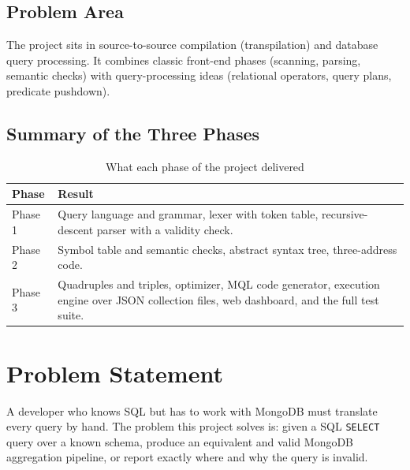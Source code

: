 \documentclass[12pt,a4paper]{report}
\newcommand{\codeus}{\textunderscore\allowbreak}
\DeclareRobustCommand{\code}[1]{\texttt{\let\_\codeus #1}}
\begin{document}
\section{Problem Area}
The project sits in source-to-source compilation (transpilation) and database query processing. It combines classic front-end phases (scanning, parsing, semantic checks) with query-processing ideas (relational operators, query plans, predicate pushdown).

\section{Summary of the Three Phases}
\begin{table}[H]
\centering\small
\begin{tabularx}{\linewidth}{|P{2.2cm}|L|}
\hline
\textbf{Phase} & \textbf{Result} \\ \hline
Phase 1 & Query language and grammar, lexer with token table, recursive-descent parser with a validity check. \\ \hline
Phase 2 & Symbol table and semantic checks, abstract syntax tree, three-address code. \\ \hline
Phase 3 & Quadruples and triples, optimizer, MQL code generator, execution engine over JSON collection files, web dashboard, and the full test suite. \\ \hline
\end{tabularx}
\caption{What each phase of the project delivered}
\end{table}

\chapter{Problem Statement}
A developer who knows SQL but has to work with MongoDB must translate every query by hand. The problem this project solves is: given a SQL \code{SELECT} query over a known schema, produce an equivalent and valid MongoDB aggregation pipeline, or report exactly where and why the query is invalid.
\end{document}
